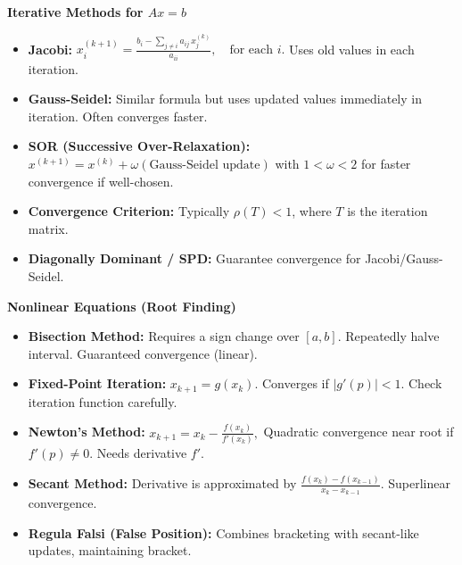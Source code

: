 \documentclass[9pt,letterpaper]{article}
\begin{document}
\begin{multicols*}{3}
  \noindent
  \textbf{\large Iterative Methods for $Ax=b$}
  \begin{itemize}
    \item \textbf{Jacobi:} 
      $
      x_i^{(k+1)} 
      = \frac{b_i - \sum_{j\neq i} a_{ij}\,x_j^{(k)}}{a_{ii}}, 
      \quad \text{for each } i.
      $
      Uses old values in each iteration.
    \item \textbf{Gauss-Seidel:} Similar formula but uses updated values immediately in iteration. Often converges faster.
    \item \textbf{SOR (Successive Over-Relaxation):} 
      $x^{(k+1)} = x^{(k)} + \omega(\text{Gauss-Seidel update})$ with $1<\omega<2$ for faster convergence if well-chosen.
    \item \textbf{Convergence Criterion:} Typically $\rho(T) < 1$, where $T$ is the iteration matrix. 
    \item \textbf{Diagonally Dominant / SPD:} Guarantee convergence for Jacobi/Gauss-Seidel.
  \end{itemize}

  \noindent
  \textbf{\large Nonlinear Equations (Root Finding)}
  \begin{itemize}
    \item \textbf{Bisection Method:} Requires a sign change over $[a,b]$. Repeatedly halve interval. Guaranteed convergence (linear).
    \item \textbf{Fixed-Point Iteration:} $x_{k+1}=g(x_k)$. Converges if $|g'(p)|<1$. Check iteration function carefully.
    \item \textbf{Newton's Method:} 
      $
      x_{k+1} = x_k - \frac{f(x_k)}{f'(x_k)},
      $
      Quadratic convergence near root if $f'(p)\neq0$. Needs derivative $f'$.
    \item \textbf{Secant Method:} Derivative is approximated by $\frac{f(x_k)-f(x_{k-1})}{x_k - x_{k-1}}$. Superlinear convergence.
    \item \textbf{Regula Falsi (False Position):} Combines bracketing with secant-like updates, maintaining bracket.
  \end{itemize}


\end{multicols*}
\end{document}
